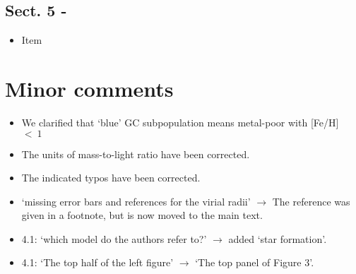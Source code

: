 \documentclass{article}
\begin{document}
\subsection*{Sect. 5 -}
\begin{itemize}
\item Item
\end{itemize}



\section*{Minor comments}
\begin{itemize}
\item We clarified that `blue' GC subpopulation means metal-poor with [Fe/H]~$<~1$
\item The units of mass-to-light ratio have been corrected.
\item The indicated typos have been corrected.
\item `missing error bars and references for the virial radii' $\rightarrow$
    The reference was given in a footnote, but is now moved to the main text.
\item 4.1: `which model do the authors refer to?' $\rightarrow$ 
    added `star formation'.
\item 4.1: `The top half of the left figure' $\rightarrow$ 
    `The top panel of Figure 3'.
\end{itemize}
\end{document}
